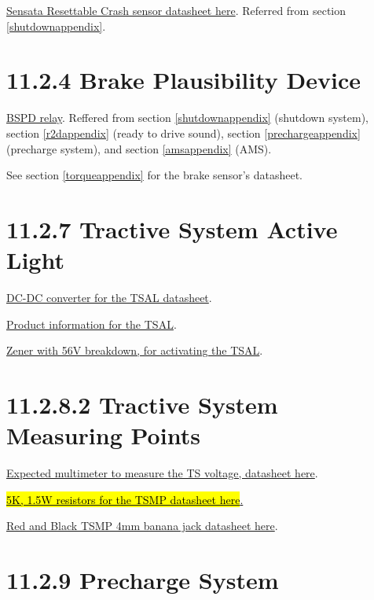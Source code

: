 \documentclass{article}
\DeclareRobustCommand{\hlr}[1]{{\sethlcolor{red}\hl{#1}}}
\begin{document}
\href{http://www.sensata.com/download/resettable-crash.pdf}{Sensata Resettable Crash sensor datasheet here}. Referred from section \ref{shutdownappendix}.

\section*{11.2.4 Brake Plausibility Device} \label{bspdappendix}

\href{http://www.te.com/commerce/DocumentDelivery/DDEController?Action=srchrtrv&DocNm=PB&DocType=DS&DocLang=English}{BSPD relay}. Reffered from section \ref{shutdownappendix} (shutdown system), section \ref{r2dappendix} (ready to drive sound), section \ref{prechargeappendix} (precharge system), and section \ref{amsappendix} (AMS).

See section \ref{torqueappendix} for the brake sensor's datasheet.

\section*{11.2.7 Tractive System Active Light}

\href{http://www.mouser.com/ds/2/281/mdc_ruw15-217876.pdf}{DC-DC converter for the TSAL datasheet}.

\href{https://www.superbrightleds.com/moreinfo/oval-marker-lamps/oval-led-truck-trailer-light-with-reflectorized-lens-4in-led-marker-clearance-light-with-4-leds/580/#/tab/Specifications}{Product information for the TSAL}.

\href{http://www.onsemi.com/pub_link/Collateral/1N5333B-D.PDF}{Zener with 56V breakdown, for activating the TSAL}.

\section*{11.2.8.2 Tractive System Measuring Points} \label{tsmpappendix}

\href{https://www.gossenmetrawatt.com/resources/tt/hit27/db_gb.pdf}{Expected multimeter to measure the TS voltage, datasheet here}.

\href{http://www.mouser.com/ds/2/427/cmfind-239942.pdf}{\hlr{5K, 1.5W resistors for the TSMP datasheet here}.}

\href{http://www.mouser.com/ds/2/159/D72930_02_10_06-21562.pdf}{Red and Black TSMP 4mm banana jack datasheet here}.

\section*{11.2.9 Precharge System}
\label{prechargeappendix}
\end{document}
